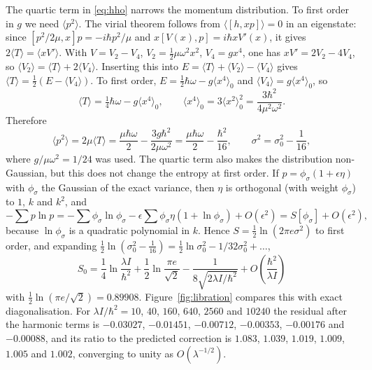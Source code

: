 \documentclass[preprint,12pt]{elsarticle}
\begin{document}
The quartic term in \eqref{eq:hho} narrows the momentum distribution. To first
order in $g$ we need $\langle p^{2}\rangle$. The virial theorem follows from
$\langle[h,xp]\rangle=0$ in an eigenstate: since
$[p^{2}/2\mu,x]p=-i\hbar p^{2}/\mu$ and $x[V(x),p]=i\hbar xV'(x)$, it gives
$2\langle T\rangle=\langle xV'\rangle$. With $V=V_{2}-V_{4}$,
$V_{2}=\tfrac12\mu\omega^{2}x^{2}$, $V_{4}=gx^{4}$, one has
$xV'=2V_{2}-4V_{4}$, so $\langle V_{2}\rangle=\langle T\rangle+2\langle V_{4}\rangle$.
Inserting this into $E=\langle T\rangle+\langle V_{2}\rangle-\langle V_{4}\rangle$
gives $\langle T\rangle=\tfrac12(E-\langle V_{4}\rangle)$. To first order,
$E=\tfrac12\hbar\omega-g\langle x^{4}\rangle_{0}$ and
$\langle V_{4}\rangle=g\langle x^{4}\rangle_{0}$, so
\begin{equation}
\langle T\rangle=\tfrac14\hbar\omega-g\langle x^{4}\rangle_{0},\qquad
\langle x^{4}\rangle_{0}=3\langle x^{2}\rangle_{0}^{2}=\frac{3\hbar^{2}}{4\mu^{2}\omega^{2}} .
\end{equation}
Therefore
\begin{equation}
\langle p^{2}\rangle=2\mu\langle T\rangle=\frac{\mu\hbar\omega}{2}
-\frac{3g\hbar^{2}}{2\mu\omega^{2}}=\frac{\mu\hbar\omega}{2}-\frac{\hbar^{2}}{16},
\qquad
\sigma^{2}=\sigma_{0}^{2}-\frac{1}{16},
\end{equation}
where $g/\mu\omega^{2}=1/24$ was used. The quartic term also makes the
distribution non-Gaussian, but this does not change the entropy at first order.
If $p=\phi_{\sigma}(1+\epsilon\eta)$ with $\phi_{\sigma}$ the Gaussian of the
exact variance, then $\eta$ is orthogonal (with weight $\phi_{\sigma}$) to $1$,
$k$ and $k^{2}$, and
\begin{equation}
-\sum p\ln p=-\sum\phi_{\sigma}\ln\phi_{\sigma}
-\epsilon\sum\phi_{\sigma}\eta\left(1+\ln\phi_{\sigma}\right)+O(\epsilon^{2})
=S[\phi_{\sigma}]+O(\epsilon^{2}),
\end{equation}
because $\ln\phi_{\sigma}$ is a quadratic polynomial in $k$. Hence
$S=\tfrac12\ln(2\pi e\sigma^{2})$ to first order, and expanding
$\tfrac12\ln(\sigma_{0}^{2}-\tfrac1{16})=\tfrac12\ln\sigma_{0}^{2}-1/32\sigma_{0}^{2}
+\dots$,
\begin{equation}
\boxed{\;
S_{0}=\frac14\ln\frac{\lambda I}{\hbar^{2}}+\frac12\ln\frac{\pi e}{\sqrt2}
-\frac{1}{8\sqrt{2\lambda I/\hbar^{2}}}+O\!\left(\frac{\hbar^{2}}{\lambda I}\right)\;}
\label{eq:S0}
\end{equation}
with $\tfrac12\ln(\pi e/\sqrt2)=0.89908$. Figure~\ref{fig:libration} compares
this with exact diagonalisation. For $\lambda I/\hbar^{2}=10$, $40$, $160$,
$640$, $2560$ and $10240$ the residual after the harmonic terms is $-0.03027$,
$-0.01451$, $-0.00712$, $-0.00353$, $-0.00176$ and $-0.00088$, and its ratio to
the predicted correction is $1.083$, $1.039$, $1.019$, $1.009$, $1.005$ and
$1.002$, converging to unity as $O(\lambda^{-1/2})$.
\end{document}

